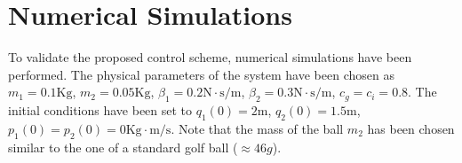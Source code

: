 \section{Numerical Simulations}
%
To validate the proposed control scheme, numerical simulations have been performed. The physical parameters of the system have been chosen as $m_1 = 0.1\text{Kg}$, $m_2 = 0.05\text{Kg}$, $\beta_1 = 0.2\text{N}\cdot \text{s}/\text{m}$, $\beta_2 = 0.3\text{N}\cdot \text{s}/\text{m}$, $c_g = c_i = 0.8$. The initial conditions have been set to $q_1(0) = 2$m, $q_2(0) = 1.5$m, $p_1(0) = p_2(0) = 0\text{Kg}\cdot \text{m}/\text{s}$. Note that the mass of the ball $m_2$ has been chosen similar to the one of a standard golf ball ($\approx 46g$).
%    
